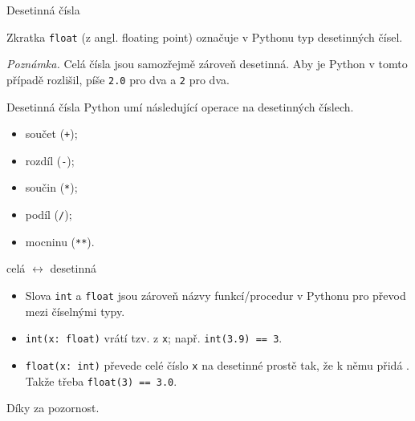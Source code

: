 \documentclass[aspectratio=169,11pt]{beamer}
\begin{document}
\begin{frame}{Desetinná čísla}
 \begin{tcolorbox}[title=Datový typ \texttt{float}]
  Zkratka \alert{\texttt{float}} (z angl. \alert{float}ing point) označuje v
  Pythonu typ desetinných čísel.
 \end{tcolorbox}
 \pause
 \emph{Poznámka.} Celá čísla jsou samozřejmě zároveň desetinná. Aby je Python v
 tomto případě rozlišil, píše \texttt{2.0} pro  dva a
 \texttt{2} pro  dva.
\end{frame}

\begin{frame}{Desetinná čísla}
 Python umí následující operace na desetinných číslech.
 \begin{itemize}
  \item součet (\texttt{+});
  \item rozdíl (\texttt{-});
  \item součin (\texttt{*});
  \item podíl (\texttt{/});
  \item mocninu (\texttt{**}).
 \end{itemize}
\end{frame}

\begin{frame}{celá $\leftrightarrow$ desetinná} 
 \begin{itemize}
  \item<1-> Slova \texttt{int} a \texttt{float} jsou zároveň názvy
   funkcí/procedur v Pythonu pro převod mezi číselnými typy.
  \item<2-> \texttt{\alert{int}(x: float)} vrátí tzv.  z
   \texttt{x}; např. \texttt{\alert{int}(3.9) == 3}.
  \item<3-> \texttt{\alert{float}(x: int)} převede celé číslo \texttt{x} na
   desetinné prostě tak, že k němu přidá . Takže třeba
   \texttt{\alert{float}(3) == 3.0}.
 \end{itemize}
\end{frame}

\begin{frame}[plain]
 \centering\Huge Díky za pozornost.
\end{frame}
\end{document}
